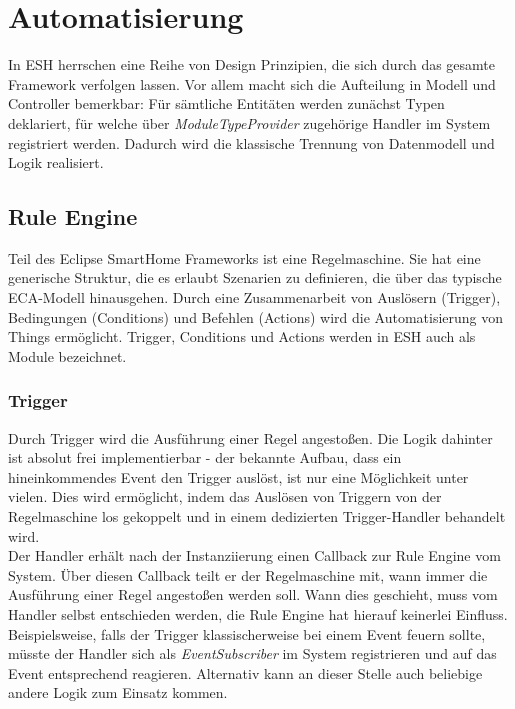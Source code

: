 \section{Automatisierung}
In ESH herrschen eine Reihe von Design Prinzipien, die sich durch das gesamte Framework verfolgen lassen. Vor allem macht sich die Aufteilung in Modell und Controller bemerkbar: Für sämtliche Entitäten werden zunächst Typen deklariert, für welche über \textit{ModuleTypeProvider} zugehörige Handler im System registriert werden. Dadurch wird die klassische Trennung von Datenmodell und Logik realisiert.

\subsection{Rule Engine}
\label{sec:ruleengine}
Teil des Eclipse SmartHome Frameworks ist eine Regelmaschine. Sie hat eine generische Struktur, die es erlaubt Szenarien zu definieren, die über das typische ECA-Modell hinausgehen. Durch eine Zusammenarbeit von Auslösern (Trigger), Bedingungen (Conditions) und Befehlen (Actions) wird die Automatisierung von Things ermöglicht. Trigger, Conditions und Actions werden in ESH auch als Module bezeichnet.


\subsubsection{Trigger}
Durch Trigger wird die Ausführung einer Regel angestoßen. Die Logik dahinter ist absolut frei implementierbar - der bekannte Aufbau, dass ein hineinkommendes Event den Trigger auslöst, ist nur eine Möglichkeit unter vielen. Dies wird ermöglicht, indem das Auslösen von Triggern von der Regelmaschine los gekoppelt und in einem dedizierten Trigger-Handler behandelt wird. \\

Der Handler erhält nach der Instanziierung einen Callback zur Rule Engine vom System. Über diesen Callback teilt er der Regelmaschine mit, wann immer die Ausführung einer Regel angestoßen werden soll. Wann dies geschieht, muss vom Handler selbst entschieden werden, die Rule Engine hat hierauf keinerlei Einfluss. Beispielsweise, falls der Trigger klassischerweise bei einem Event feuern sollte, müsste der Handler sich als \textit{EventSubscriber} im System registrieren und auf das Event entsprechend reagieren. Alternativ kann an dieser Stelle auch beliebige andere Logik zum Einsatz kommen.\\


